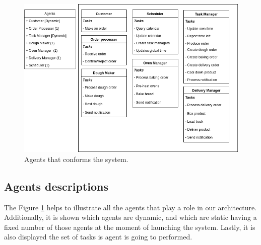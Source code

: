 \documentclass[a4paper]{article}
\begin{document}
	 \begin{figure}[h!]
	 	\includegraphics[scale=0.5]{img/architecture-Agents.png}
	 	\caption{Agents that conforms the system.}
	 	\label{fig: Ag}
	 \end{figure}
	 
	 \subsection{Agents descriptions}
	 
	 The Figure \ref{fig: Ag} helps to illustrate all the agents that play a role in our architecture. Additionally, it is shown which agents are dynamic, and which are static having a fixed number of those agents at the moment of launching the system. Lastly, it is also displayed the set of tasks is agent is going to performed.
	 
\end{document}
